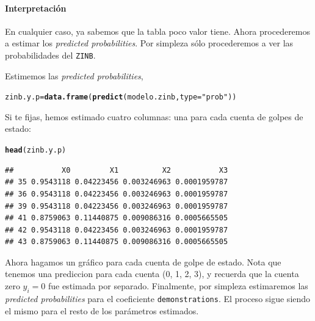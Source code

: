 \documentclass[onesided]{article}\usepackage[]{graphicx}\usepackage[]{color}
\makeatletter
\newcommand{\hlstr}[1]{\textcolor[rgb]{0.192,0.494,0.8}{#1}}%
\newcommand{\hlstd}[1]{\textcolor[rgb]{0.345,0.345,0.345}{#1}}%
\newcommand{\hlkwb}[1]{\textcolor[rgb]{0.69,0.353,0.396}{#1}}%
\newcommand{\hlkwc}[1]{\textcolor[rgb]{0.333,0.667,0.333}{#1}}%
\newcommand{\hlkwd}[1]{\textcolor[rgb]{0.737,0.353,0.396}{\textbf{#1}}}%
\newenvironment{kframe}{%
 \def\at@end@of@kframe{}%
 \ifinner\ifhmode%
  \def\at@end@of@kframe{\end{minipage}}%
  \begin{minipage}{\columnwidth}%
 \fi\fi%
 \def\FrameCommand##1{\hskip\@totalleftmargin \hskip-\fboxsep
 \colorbox{shadecolor}{##1}\hskip-\fboxsep
     \hskip-\linewidth \hskip-\@totalleftmargin \hskip\columnwidth}%
 \MakeFramed {\advance\hsize-\width
   \@totalleftmargin\z@ \linewidth\hsize
   \@setminipage}}%
 {\par\unskip\endMakeFramed%
 \at@end@of@kframe}
\newenvironment{knitrout}{}{} %
\makeatother
\begin{document}
\paragraph{Interpretaci\'on}  En cualquier caso, ya sabemos que la tabla poco valor tiene. Ahora procederemos a estimar los \emph{predicted probabilities}. Por simpleza s\'olo procederemos a ver las probabilidades del \texttt{ZINB}.


Estimemos las \emph{predicted probabilities},

\begin{kframe}
\begin{alltt}
\hlstd{zinb.y.p} \hlkwb{=} \hlkwd{data.frame}\hlstd{(}\hlkwd{predict}\hlstd{(modelo.zinb,}\hlkwc{type} \hlstd{=} \hlstr{"prob"}\hlstd{))}
\end{alltt}
\end{kframe}

Si te fijas, hemos estimado cuatro columnas: una para cada cuenta de golpes de estado:

\begin{knitrout}
\color{fgcolor}\begin{kframe}
\begin{alltt}
\hlkwd{head}\hlstd{(zinb.y.p)}
\end{alltt}
\begin{verbatim}
##           X0         X1          X2           X3
## 35 0.9543118 0.04223456 0.003246963 0.0001959787
## 36 0.9543118 0.04223456 0.003246963 0.0001959787
## 39 0.9543118 0.04223456 0.003246963 0.0001959787
## 41 0.8759063 0.11440875 0.009086316 0.0005665505
## 42 0.9543118 0.04223456 0.003246963 0.0001959787
## 43 0.8759063 0.11440875 0.009086316 0.0005665505
\end{verbatim}
\end{kframe}
\end{knitrout}

Ahora hagamos un gr\'afico para cada cuenta de golpe de estado. Nota que tenemos una prediccion para cada cuenta (0, 1, 2, 3), y recuerda que la cuenta zero $y_{i}=0$ fue estimada por separado. Finalmente, por simpleza estimaremos las \emph{predicted probabilities} para el coeficiente \texttt{demonstrations}. El proceso sigue siendo el mismo para el resto de los par\'ametros estimados. 
\end{document}
